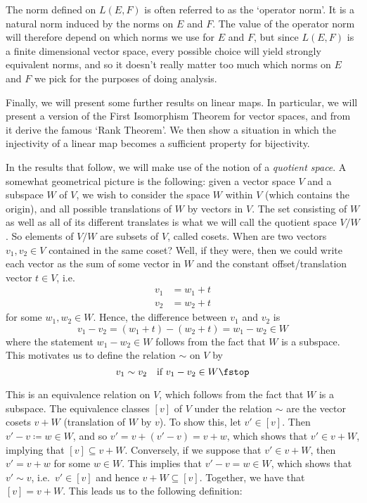 The norm defined on \( L(E,F) \) is often referred to as the `operator norm'. It is a natural norm induced by the norms on \( E \) and \( F \). The value of the operator norm will therefore depend on which norms we use for \( E \) and \( F \), but since \( L(E,F) \) is a finite dimensional vector space, every possible choice will yield strongly equivalent norms, and so it doesn't really matter too much which norms on \( E \) and \( F \) we pick for the purposes of doing analysis.

 \vspace{3mm}

 Finally, we will present some further results on linear maps. In particular, we will present a version of the First Isomorphism Theorem for vector spaces, and from it derive the famous `Rank Theorem'. We then show a situation in which the injectivity of a linear map becomes a sufficient property for bijectivity.

 \vspace{3mm}
 
 In the results that follow, we will make use of the notion of a \emph{quotient space}. A somewhat geometrical picture is the following: given a vector space \( V \) and a subspace \( W \) of \( V \), we wish to consider the space \( W \) within \( V \) (which contains the origin), and all possible translations of \( W \) by vectors in \( V \). The set consisting of \( W \) as well as all of its different translates is what we will call the quotient space \( V/W \). So elements of \( V/W \) are subsets of \( V \), called cosets. When are two vectors \( v_1,v_2\in V \) contained in the same coset? Well, if they were, then we could write each vector as the sum of some vector in \( W \) and the constant offset/translation vector \( t\in V \), i.e.\
 \begin{align*}
   v_1&= w_1+t\\
   v_2&= w_2+t
 \end{align*}
 for some \( w_1,w_2\in W \). Hence, the difference between \( v_1 \) and \( v_2 \) is
 \[ v_1-v_2=(w_1+t)-(w_2+t)=w_1-w_2\in W \]
 where the statement \( w_1-w_2\in W \) follows from the fact that \( W \) is a subspace. This motivates us to define the relation \( \sim \) on \( V \) by
 \[ v_1\sim v_2\quad\text{if }v_1-v_2\in W\fstop \]

 This is an equivalence relation on \( V \), which follows from the fact that \( W \) is a subspace. The equivalence classes \( [v] \) of \( V \) under the relation \( \sim \) are the vector cosets \( v+W \) (translation of \( W \) by \( v \)). To show this, let \( v'\in [v] \). Then \( v'-v\coloneqq w\in W \), and so \( v'=v+(v'-v)=v+w \), which shows that \( v'\in v+W \), implying that \( [v]\subseteq v+W \). Conversely, if we suppose that \( v'\in v+W \), then \( v'=v+w \) for some \( w\in W \). This implies that \( v'-v=w\in W \), which shows that \( v'\sim v \), i.e.\ \( v'\in [v] \) and hence \( v+W\subseteq [v] \). Together, we have that \( [v]=v+W \). This leads us to the following definition:
 
